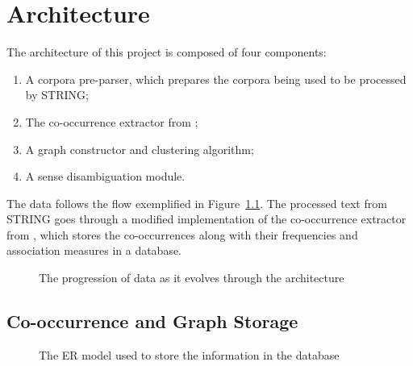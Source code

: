 \chapter{Architecture}
\label{sec:architecture}

The architecture of this project is composed of four components:

\begin{enumerate}
  \item A corpora pre-parser, which prepares the corpora being used to be
processed by \ac{STRING};
  \item The co-occurrence extractor from \cite{correia2015syntax};
  \item A graph constructor and clustering algorithm;
  \item A sense disambiguation module.
\end{enumerate}

The data follows the flow exemplified in Figure~\ref{fig:data-progression}. The
processed text from \ac{STRING} goes through a modified implementation of the
co-occurrence extractor from \cite{correia2015syntax}, which stores the
co-occurrences along with their frequencies and association measures in a
database.

\begin{figure}[h]
 \centering
 
 \caption{The progression of data as it evolves through the architecture}
 \label{fig:data-progression}
\end{figure}

\section{Co-occurrence and Graph Storage}

\begin{figure}[h]
  \centering
  
  \caption{The \acl*{ER} model used to store the information in the database}
  \label{fig:er-model}
\end{figure}


